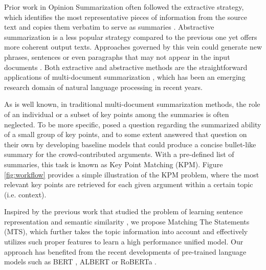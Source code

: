Prior work in Opinion Summarization often followed the extractive strategy, which identifies the most representative pieces of information from the source text and copies them verbatim to serve as summaries \citep{angelidis-lapata-2018-summarizing, brazinskas2019unsupervised}. Abstractive summarization is a less popular strategy compared to the previous one yet offers more coherent output texts. Approaches governed by this vein could generate new phrases, sentences or even paragraphs that may not appear in the input documents \citep{ganesan-etal-2010-opinosis, isonuma2021unsupervised}. Both extractive and abstractive methods are the straightforward applications of multi-document summarization \citep{liu2018generating, fabbri-etal-2019-multi}, which has been an emerging research domain of natural language processing in recent years.

As is well known, in traditional multi-document summarization methods, the role of an individual or a subset of key points among the summaries is often neglected. To be more specific, \citet{bar-haim-etal-2020-arguments} posed a question regarding the summarized ability of a small group of key points, and to some extent answered that question on their own by developing baseline models that could produce a concise bullet-like summary for the crowd-contributed arguments.
With a pre-defined list of summaries, this task is known as Key Point Matching (KPM). Figure \ref{fig:workflow} provides a simple illustration of the KPM problem, where the most relevant key points are retrieved for each given argument within a certain topic (i.e. context).

Inspired by the previous work that studied the problem of learning sentence representation \citep{cer2018universal, reimers-gurevych-2019-sentence} and semantic similarity \citep{yan2021consert}, we propose Matching The Statements (MTS), which further takes the topic information into account and effectively utilizes such proper features to learn a high performance unified model. Our approach has benefited from the recent developments of pre-trained language models such as BERT \citep{devlin2018bert}, ALBERT \citep{lan2019albert} or RoBERTa \citep{liu2019roberta}.

